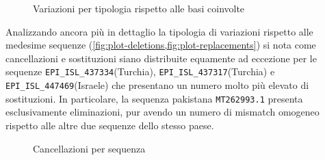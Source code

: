 \documentclass[11pt,italian]{article}
\begin{document}
\begin{figure}[H]
  \caption{Variazioni per tipologia rispetto alle basi coinvolte}
  \label{fig:plot-alterations}
\end{figure}

\noindent
Analizzando ancora più in dettaglio la tipologia di variazioni rispetto alle medesime sequenze (\cref{fig:plot-deletions,fig:plot-replacements}) si nota come cancellazioni e sostituzioni siano distribuite equamente ad eccezione per le sequenze \lstinline{EPI_ISL_437334}(Turchia), \lstinline{EPI_ISL_437317}(Turchia) e \lstinline{EPI_ISL_447469}(Israele) che presentano un numero molto più elevato di sostituzioni. In particolare, la sequenza pakistana \lstinline{MT262993.1} presenta esclusivamente eliminazioni, pur avendo un numero di mismatch omogeneo rispetto alle altre due sequenze dello stesso paese.

\begin{figure}[H]
  \caption{Cancellazioni per sequenza}
  \label{fig:plot-deletions}
\end{figure}
\end{document}
